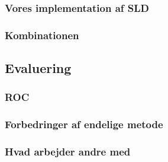 \subsubsection{Vores implementation af SLD}

\subsubsection{Kombinationen} %
\subsection{Evaluering}
\subsubsection{ROC}
\subsubsection{Forbedringer af endelige metode}
\subsubsection{Hvad arbejder andre med} %
